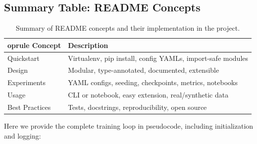 \subsection{Summary Table: README Concepts}
\begin{table}[H]
  \centering
  \begin{tabular}{ll}
    	oprule
    Concept & Description \\
    \midrule
    Quickstart & Virtualenv, pip install, config YAMLs, import-safe modules \\
    Design & Modular, type-annotated, documented, extensible \\
    Experiments & YAML configs, seeding, checkpoints, metrics, notebooks \\
    Usage & CLI or notebook, easy extension, real/synthetic data \\
    Best Practices & Tests, docstrings, reproducibility, open source \\
    \bottomrule
  \end{tabular}
  \caption{Summary of README concepts and their implementation in the project.}
\end{table}

Here we provide the complete training loop in pseudocode, including initialization and logging:

